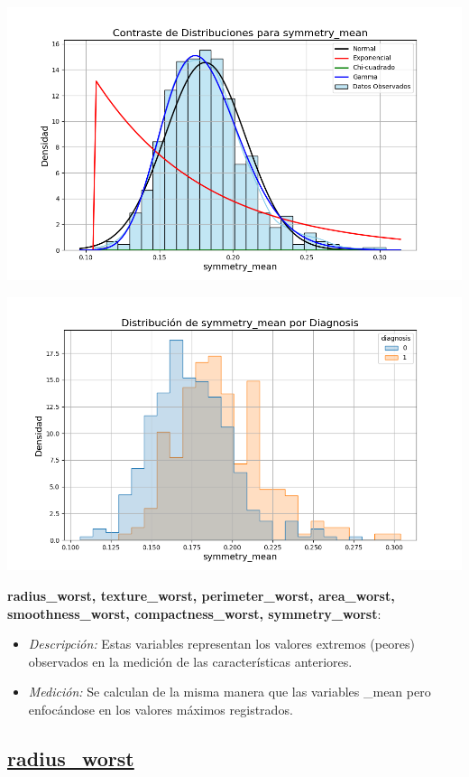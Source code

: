 \documentclass[a4paper, 12pt]{article}
\begin{document}
\includegraphics[width=\textwidth]{../Plots/plots_stats/symmetry_mean/distribuciones_conocidas_symmetry_mean.png}

\includegraphics[width=\textwidth]{../Plots/plots_diagnosis/distribucion_symmetry_mean_por_diagnosis.png}

\newpage 

\textbf{radius\_worst, texture\_worst, perimeter\_worst, area\_worst, smoothness\_worst, compactness\_worst, symmetry\_worst}:
\begin{itemize}
	\item \textit{Descripción:} Estas variables representan los valores extremos (peores) observados en la medición de las características anteriores.
	\item \textit{Medición:} Se calculan de la misma manera que las variables \_mean pero enfocándose en los valores máximos registrados.
\end{itemize}



\subsection*{\underline{radius\_worst}}
\end{document}
